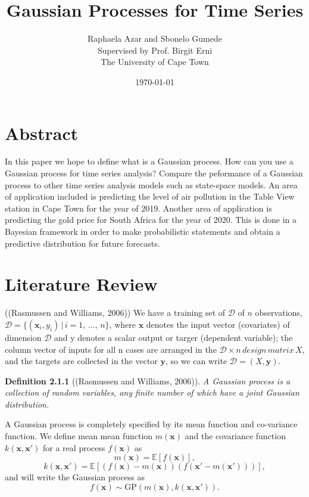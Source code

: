 \documentclass[a4paper, 10pt]{article}
\title{Gaussian Processes for Time Series}
\date{\today}
\author{Raphaela Azar and Sbonelo Gumede \\
Supervised by Prof. Birgit Erni\\
The University of Cape Town}
\begin{document}
   \maketitle

   \begin{flushleft}

   \section*{Abstract}

    In this paper we hope to define what is a Gaussian process. How can you use a Gaussian process for time series analysis? Compare the peformance of a Gaussian process to other time series analysis models such as state-space models. An area of application included is predicting the level of air pollution in the Table View station in Cape Town for the year of 2019. Another area of application is predicting the gold price for South Africa for the year of 2020. This is done in a Bayesian framework in order to make probabilistic statements and obtain a predictive distribution for future forecasts.

   \newpage

   \section*{Literature Review}

   ((Rasmussen and Williams, 2006)) We have a training set of $\mathcal{D}$ of $n$ observations, $\mathcal{D} = \{(\mathbf{x}_{i}, y_{i}) \, | \, i = 1, \, \ldots, \, n\}$, where $\mathbf{x}$ denotes the input vector (covariates) of dimension $\mathcal{D}$ and y denotes a scalar output or targer (dependent variable); the column vector of inputs for all n cases are arranged in the $\mathcal{D} \times n \, design \, matrix\, X$, and the targets are collected in the vector $\mathbf{y}$, so we can write $\mathcal{D} = (X, \mathbf{y})$. 

   \vspace{1em}

   \textbf{Definition 2.1.1} ((Rasmussen and Williams, 2006)).
   \textit{A Gaussian process is a collection of random variables, any finite number of which have a joint Gaussian distribution.}

   \vspace{1em}

   A Gaussian process is completely specified by its mean function and co-variance function. We define mean mean function $m(\mathbf{x})$ and the covariance function $k(\mathbf{x}, \mathbf{x}')$ for a real process $f(\mathbf{x})$ as
   $$m(\mathbf{x}) = \mathbb{E}[f(\mathbf{x})],$$
   $$k(\mathbf{x}, \mathbf{x}') = \mathbb{E}[(f(\mathbf{x}) - m(\mathbf{x}))(f(\mathbf{x}' - m(\mathbf{x}')))],$$
   and will write the Gaussian process as
   $$f(\mathbf{x}) \sim \text{GP}(m(\mathbf{x}), k(\mathbf{x}, \mathbf{x}')).$$


\end{flushleft}
\end{document}
